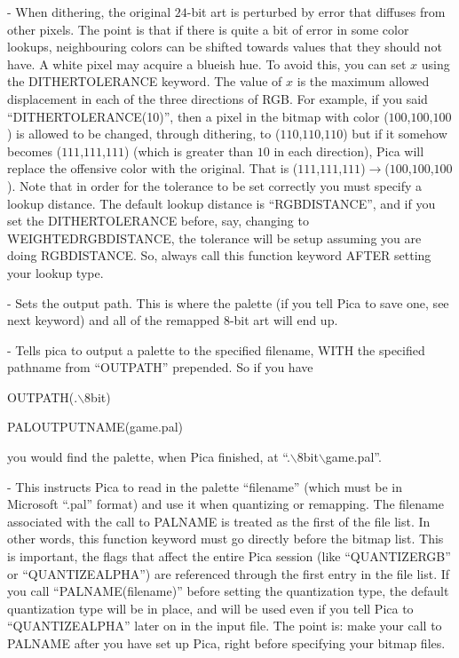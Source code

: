  - When dithering, the original $24$-bit art is perturbed by 
error that diffuses from other pixels. The point is that if there is quite a bit of error
in some color lookups, neighbouring colors can be shifted towards values that they should not
have. A white pixel may acquire a blueish hue. To avoid this, you can set $x$ using the
DITHERTOLERANCE keyword. The value of $x$ is the maximum allowed displacement in each of the
three directions of RGB. For example, if you said ``DITHERTOLERANCE(10)'', then a pixel in the
bitmap with color ($100$,$100$,$100$) is allowed to be changed, through dithering, to 
($110$,$110$,$110$) but if it somehow becomes ($111$,$111$,$111$) (which is greater than
$10$ in each direction), Pica will replace the
offensive color with the original. That is ($111$,$111$,$111$)$\rightarrow$($100$,$100$,$100$).
Note that in order for the tolerance to be set correctly you must specify a lookup distance. 
The default lookup distance is ``RGBDISTANCE'', and if you set the DITHERTOLERANCE before, say, changing
to WEIGHTEDRGBDISTANCE, the tolerance will be setup assuming you are doing RGBDISTANCE. So,
always call this function keyword AFTER setting your lookup type.


 - Sets the output path. This is where the palette (if you
tell Pica to save one, see next keyword) and all of the remapped $8$-bit art will end up.

 - Tells pica to output a palette to the specified
filename, WITH the specified pathname from ``OUTPATH'' prepended. So if you have


OUTPATH(.$\backslash$8bit)


PALOUTPUTNAME(game.pal)

\newpar you would find the palette, when Pica finished, at ``.$\backslash$8bit$\backslash$game.pal''.

 - This instructs Pica to read in the palette ``filename'' 
(which must be in Microsoft ``.pal'' format) and use it when quantizing or remapping. The
filename associated with the call to PALNAME is treated as the first of the file list. In
other words, this function keyword must go directly before the bitmap list. This is important,
the flags that affect the entire Pica session (like ``QUANTIZERGB'' or ``QUANTIZEALPHA'') are
referenced through the first entry in the file list. If you call ``PALNAME(filename)'' before
setting the quantization type, the default quantization type will be in place, and will 
be used even if you tell Pica to ``QUANTIZEALPHA'' later on in the input file. The point is:
make your call to PALNAME after you have set up Pica, right before specifying your bitmap
files.

